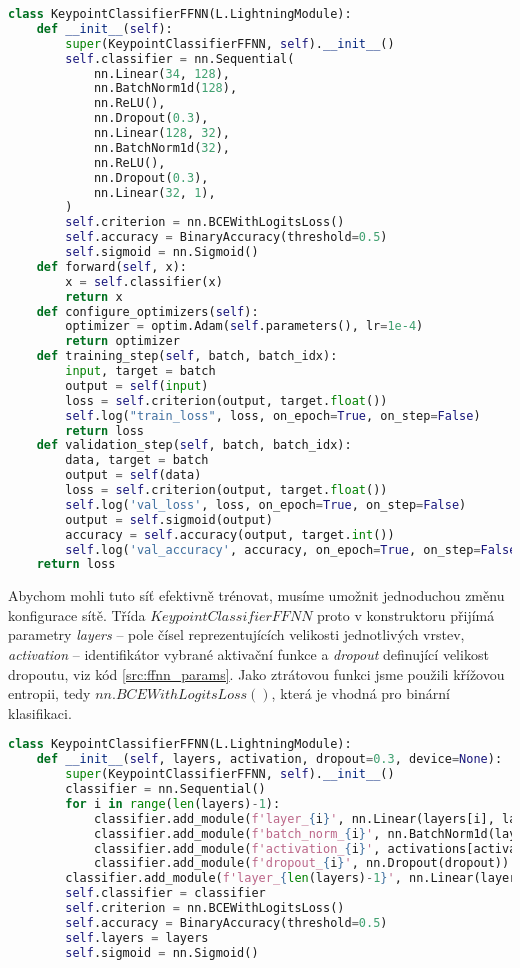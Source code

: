 \begin{lstlisting}[language=Python, label=src:ffnn, caption={Ukázka implementace Dopředné sítě v PyTorch Lightning}]
class KeypointClassifierFFNN(L.LightningModule):
    def __init__(self):
        super(KeypointClassifierFFNN, self).__init__()
        self.classifier = nn.Sequential(
            nn.Linear(34, 128),
            nn.BatchNorm1d(128),
            nn.ReLU(),
            nn.Dropout(0.3),
            nn.Linear(128, 32),
            nn.BatchNorm1d(32),
            nn.ReLU(),
            nn.Dropout(0.3),
            nn.Linear(32, 1),
        )
        self.criterion = nn.BCEWithLogitsLoss()
        self.accuracy = BinaryAccuracy(threshold=0.5)
        self.sigmoid = nn.Sigmoid()    
    def forward(self, x):
        x = self.classifier(x)
        return x
    def configure_optimizers(self):
        optimizer = optim.Adam(self.parameters(), lr=1e-4)
        return optimizer
    def training_step(self, batch, batch_idx):
        input, target = batch
        output = self(input)
        loss = self.criterion(output, target.float())    
        self.log("train_loss", loss, on_epoch=True, on_step=False)
        return loss
    def validation_step(self, batch, batch_idx):
        data, target = batch
        output = self(data)
        loss = self.criterion(output, target.float())
        self.log('val_loss', loss, on_epoch=True, on_step=False)
        output = self.sigmoid(output)
        accuracy = self.accuracy(output, target.int())    
        self.log('val_accuracy', accuracy, on_epoch=True, on_step=False)
    return loss
\end{lstlisting}

Abychom mohli tuto síť efektivně trénovat, musíme umožnit jednoduchou změnu
konfigurace sítě. Třída $KeypointClassifierFFNN$ proto v konstruktoru přijímá
parametry \textit{layers} – pole čísel reprezentujících velikosti jednotlivých
vrstev, \textit{activation} – identifikátor vybrané aktivační funkce a
\textit{dropout} definující velikost dropoutu, viz kód \ref{src:ffnn_params}.
Jako ztrátovou funkci jsme použili křížovou entropii, tedy
$nn.BCEWithLogitsLoss()$, která je vhodná pro binární klasifikaci.

\begin{lstlisting}[language=Python, label=src:ffnn_params, caption={Parametrizace konfigurace dopředné sítě}] 
class KeypointClassifierFFNN(L.LightningModule):
    def __init__(self, layers, activation, dropout=0.3, device=None):
        super(KeypointClassifierFFNN, self).__init__()        
        classifier = nn.Sequential()
        for i in range(len(layers)-1):
            classifier.add_module(f'layer_{i}', nn.Linear(layers[i], layers[i+1]))
            classifier.add_module(f'batch_norm_{i}', nn.BatchNorm1d(layers[i+1]))
            classifier.add_module(f'activation_{i}', activations[activation])
            classifier.add_module(f'dropout_{i}', nn.Dropout(dropout))
        classifier.add_module(f'layer_{len(layers)-1}', nn.Linear(layers[-1], 1))
        self.classifier = classifier
        self.criterion = nn.BCEWithLogitsLoss()
        self.accuracy = BinaryAccuracy(threshold=0.5)
        self.layers = layers
        self.sigmoid = nn.Sigmoid()   
\end{lstlisting}

